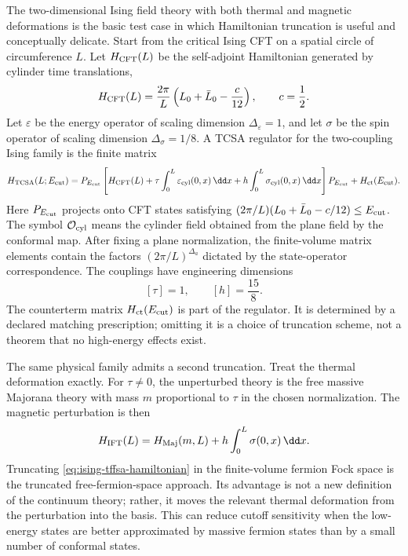 The two-dimensional Ising field theory with both thermal and magnetic
deformations is the basic test case in which Hamiltonian truncation is useful
and conceptually delicate.  Start from the critical Ising CFT on a spatial
circle of circumference \(L\).  Let \(H_{\rm CFT}(L)\) be the self-adjoint
Hamiltonian generated by cylinder time translations,
\[
  H_{\rm CFT}(L)
  =
  \frac{2\pi}{L}
  \left(L_0+\bar L_0-\frac{c}{12}\right),
  \qquad c=\frac12 .
\]
Let \(\varepsilon\) be the energy operator of scaling dimension
\(\Delta_\varepsilon=1\), and let \(\sigma\) be the spin operator of scaling
dimension \(\Delta_\sigma=1/8\).  A TCSA regulator for the two-coupling Ising
family is the finite matrix
\begin{equation}
  H_{\rm TCSA}(L;E_{\rm cut})
  =
  P_{E_{\rm cut}}
  \left[
    H_{\rm CFT}(L)
    +
    \tau\int_0^L\varepsilon_{\rm cyl}(0,x)\,\dd x
    +
    h\int_0^L\sigma_{\rm cyl}(0,x)\,\dd x
  \right]
  P_{E_{\rm cut}}
  +
  H_{\rm ct}(E_{\rm cut}).
  \label{eq:ising-two-coupling-tcsa-hamiltonian}
\end{equation}
Here \(P_{E_{\rm cut}}\) projects onto CFT states satisfying
\((2\pi/L)(L_0+\bar L_0-c/12)\le E_{\rm cut}\).  The symbol
\(\mathcal O_{\rm cyl}\) means the cylinder field obtained from the plane
field by the conformal map.  After fixing a plane normalization, the
finite-volume matrix elements contain the factors \((2\pi/L)^{\Delta_a}\)
dictated by the state-operator correspondence.  The couplings have
engineering dimensions
\[
  [\tau]=1,\qquad [h]=\frac{15}{8}.
\]
The counterterm matrix \(H_{\rm ct}(E_{\rm cut})\) is part of the regulator.
It is determined by a declared matching prescription; omitting it is a choice
of truncation scheme, not a theorem that no high-energy effects exist.

The same physical family admits a second truncation.  Treat the thermal
deformation exactly.  For \(\tau\ne0\), the unperturbed theory is the free
massive Majorana theory with mass \(m\) proportional to \(\tau\) in the chosen
normalization.  The magnetic perturbation is then
\begin{equation}
  H_{\rm IFT}(L)
  =
  H_{\rm Maj}(m,L)
  +
  h\int_0^L\sigma(0,x)\,\dd x .
  \label{eq:ising-tffsa-hamiltonian}
\end{equation}
Truncating \eqref{eq:ising-tffsa-hamiltonian} in the finite-volume fermion
Fock space is the truncated free-fermion-space approach.  Its advantage is
not a new definition of the continuum theory; rather, it moves the relevant
thermal deformation from the perturbation into the basis.  This can reduce
cutoff sensitivity when the low-energy states are better approximated by
massive fermion states than by a small number of conformal states.

